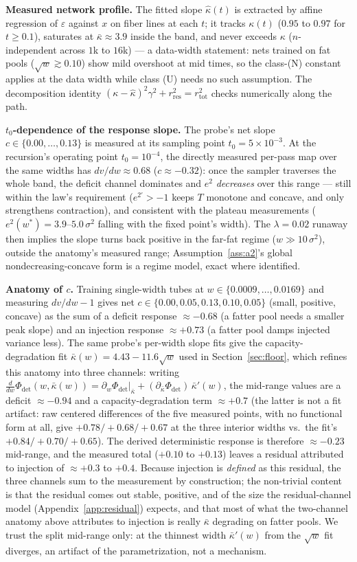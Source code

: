 \documentclass[11pt]{article}
\theoremstyle{remark}
\newcommand{\kb}{\bar\kappa}
\newcommand{\epshat}{\hat\varepsilon}
\newcommand{\Phidet}{\Phi_{\mathrm{det}}}
\newcommand{\sigsq}{\sigma^2}
\begin{document}
\textbf{Measured network profile.} The fitted slope $\hat\kappa(t)$ is extracted by
affine regression of $\epshat$ against $x$ on fiber lines at each $t$; it tracks
$\kappa(t)$ ($0.95$ to $0.97$ for $t\ge0.1$), saturates at $\kb\approx3.9$ inside the
band, and never exceeds $\kappa$ ($n$-independent across $1$k to $16$k) --- a
data-width statement: nets trained on fat pools ($\sqrt w\gtrsim0.10$) show mild
overshoot at mid times, so the class-(N) constant applies at the data width while
class (U) needs no such assumption. The decomposition
identity $(\kappa-\hat\kappa)^2\gamma^2+r^2_{\mathrm{res}}=r^2_{\mathrm{tot}}$ checks
numerically along the path.

\textbf{$t_0$-dependence of the response slope.} The probe's net slope
$c\in\{0.00,\dots,0.13\}$ is measured at its sampling point $t_0=5\times10^{-3}$. At
the recursion's operating point $t_0=10^{-4}$, the directly measured per-pass map over
the same widths has $dv/dw\approx0.68$ ($c\approx-0.32$): once the sampler traverses
the whole band, the deficit channel dominates and $e^2$ \emph{decreases} over this
range --- still within the law's requirement ($e^{2\prime}>-1$ keeps $T$ monotone and
concave, and only strengthens contraction), and consistent with the plateau
measurements ($e^2(w^*)=3.9$--$5.0\,\sigsq$ falling with the fixed point's width). The
$\lambda=0.02$ runaway then implies the slope turns back positive in the far-fat
regime ($w\gg10\,\sigsq$), outside the anatomy's measured range; Assumption~\ref{ass:a2}'s
global nondecreasing-concave form is a regime model, exact where identified.

\textbf{Anatomy of $c$.} Training single-width tubes at
$w\in\{0.0009,\dots,0.0169\}$ and measuring $dv/dw-1$ gives net
$c\in\{0.00,0.05,0.13,0.10,0.05\}$ (small, positive, concave) as the sum of a
deficit response $\approx-0.68$ (a fatter pool needs a smaller peak slope) and an
injection response $\approx+0.73$ (a fatter pool damps injected variance less).
The same probe's per-width slope fits give the capacity-degradation fit
$\kb(w)=4.43-11.6\sqrt{w}$ used in Section~\ref{sec:floor}, which refines this
anatomy into three channels: writing
$\tfrac{d}{dw}\Phidet(w,\kb(w))
=\partial_w\Phidet|_{\kb}+(\partial_{\kb}\Phidet)\,\kb'(w)$, the mid-range values
are a deficit $\approx-0.94$ and a capacity-degradation term $\approx+0.7$
(the latter is not a fit artifact: raw centered differences of the five measured
points, with no functional form at all, give $+0.78/+0.68/+0.67$ at the three
interior widths vs.\ the fit's $+0.84/+0.70/+0.65$). The derived deterministic
response is therefore $\approx-0.23$ mid-range, and the measured total ($+0.10$
to $+0.13$) leaves a residual attributed to injection of $\approx+0.3$ to
$+0.4$. Because injection is \emph{defined} as this residual, the three channels
sum to the measurement by construction; the non-trivial content is that the
residual comes out stable, positive, and of the size the residual-channel model
(Appendix~\ref{app:residual}) expects, and that most of what the two-channel
anatomy above attributes to injection is really $\kb$ degrading on fatter pools.
We trust the split mid-range only: at the thinnest width $\kb'(w)$ from the
$\sqrt w$ fit diverges, an artifact of the parametrization, not a mechanism.
\end{document}
